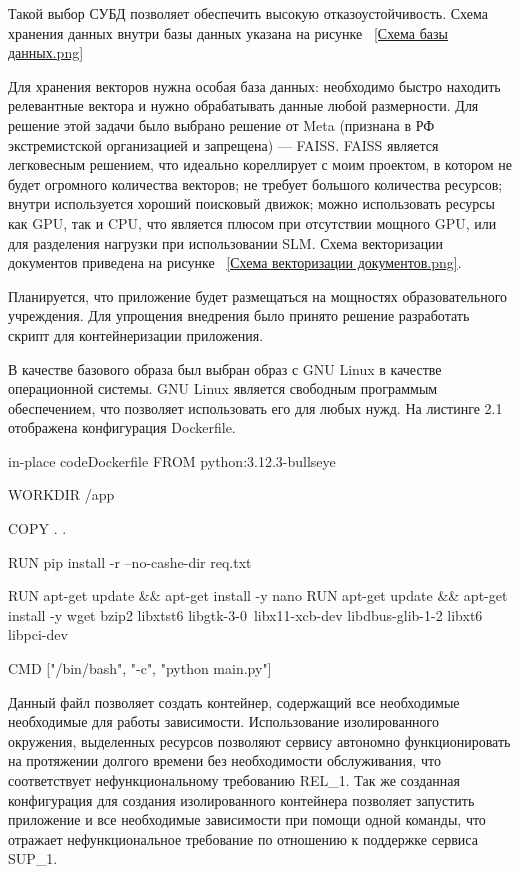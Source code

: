 Такой выбор СУБД позволяет обеспечить высокую отказоустойчивость. Схема 
хранения данных внутри базы данных указана на рисунке
~\ref{Схема базы данных.png}



Для хранения векторов нужна особая база данных: необходимо быстро находить
релевантные вектора и нужно обрабатывать данные любой размерности.
Для решение этой задачи было выбрано решение от Meta (признана в РФ
экстремистской организацией и запрещена) --- FAISS. FAISS является легковесным
решением, что идеально кореллирует с моим проектом, в котором не будет огромного
количества векторов; не требует большого количества ресурсов; внутри используется
хороший поисковый движок; можно использовать ресурсы как GPU, так и CPU, что
является плюсом при отсутствии мощного GPU, или для разделения нагрузки при
использовании SLM\@. Схема векторизации документов приведена на рисунке
~\ref{Схема векторизации документов.png}.


Планируется, что приложение будет размещаться на мощностях образовательного
учреждения. Для упрощения внедрения было принято решение разработать скрипт
для контейнеризации приложения.

В качестве базового образа был выбран образ с GNU Linux в качестве
операционной системы.
GNU Linux является свободным программым обеспечением, что позволяет
использовать его для любых нужд. На листинге 2.1 отображена конфигурация
Dockerfile.

\begin{codepiece}{in-place code}{Dockerfile}
    FROM python:3.12.3-bullseye
    
    WORKDIR /app
    
    COPY . .
    
    RUN pip install -r --no-cashe-dir req.txt
    
    RUN apt-get update && apt-get install -y nano
    RUN apt-get update && apt-get install -y wget bzip2 libxtst6 libgtk-3-0\
     libx11-xcb-dev libdbus-glib-1-2 libxt6 libpci-dev
    
    CMD ["/bin/bash", "-c", "python main.py"]
\end{codepiece}

Данный файл позволяет создать контейнер, содержащий все необходимые 
необходимые для работы зависимости. Использование изолированного окружения,
выделенных ресурсов позволяют сервису автономно функционировать на протяжении
долгого времени без необходимости обслуживания, что соответствует
нефункциональному требованию REL\_1. Так же созданная конфигурация для создания
изолированного контейнера позволяет запустить приложение и все необходимые
зависимости при помощи одной команды, что отражает нефункциональное требование
по отношению к поддержке сервиса SUP\_1.

